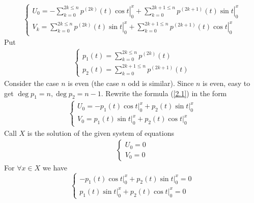 \documentclass{article}
\begin{document}
\begin{align}
	\left\{ \begin{array}{l}
		{U_0} =  - \sum\limits_{k = 0}^{2k \le n} {\left. {{p^{\left( {2k} \right)}}\left( t \right)\cos t} \right|_0^x}  + \sum\limits_{k = 0}^{2k + 1 \le n} {\left. {{p^{\left( {2k + 1} \right)}}\left( t \right)\sin t} \right|_0^x} \\
		{V_k} = \sum\limits_{k = 0}^{2k \le n} {\left. {{p^{\left( {2k} \right)}}\left( t \right)\sin t} \right|_0^x}  + \sum\limits_{k = 0}^{2k + 1 \le n} {\left. {{p^{\left( {2k + 1} \right)}}\left( t \right)\cos t} \right|_0^x} 
	\end{array} \right.
\end{align}
Put 
\begin{align}
	\left\{ \begin{array}{l}
		{p_1}\left( t \right) = \sum\limits_{k = 0}^{2k \le n} {{p^{\left( {2k} \right)}}\left( t \right)} \\
		{p_2}\left( t \right) = \sum\limits_{k = 0}^{2k + 1 \le n} {{p^{\left( {2k + 1} \right)}}\left( t \right)} 
	\end{array} \right.
\end{align}
Consider the case $n$ is even (the case $n$ odd is similar). Since $n$ is even, easy to get $\deg {p_1} = n,\deg {p_2} = n - 1$. Rewrite the formula (\ref{2.1}) in the form
\begin{align}
	\left\{ {\begin{array}{*{20}{c}}
			{{U_0} =  - {p_1}\left( t \right)\left. {\cos t} \right|_0^x + {p_2}\left( t \right)\left. {\sin t} \right|_0^x}\\
			{{V_0} = {p_1}\left( t \right)\left. {\sin t} \right|_0^x + {p_2}\left( t \right)\left. {\cos t} \right|_0^x}
	\end{array}} \right.
\end{align}
Call $X$ is the solution of the given system of equations 
\begin{align}
	\left\{ {\begin{array}{*{20}{c}}
			{{U_0} = 0}\\
			{{V_0} = 0}
	\end{array}} \right.
\end{align}
For $\forall x \in X$ we have
\begin{equation}
	\left\{ {\begin{array}{*{20}{c}}
			{ - {p_1}\left( t \right)\left. {\cos t} \right|_0^x + {p_2}\left( t \right)\left. {\sin t} \right|_0^x = 0}\\
			{{p_1}\left( t \right)\left. {\sin t} \right|_0^x + {p_2}\left( t \right)\left. {\cos t} \right|_0^x = 0}
	\end{array}} \right.
\end{equation}
\end{document}
